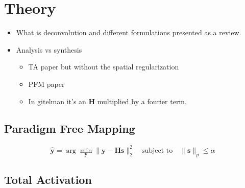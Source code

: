 \section{Theory}

\begin{itemize}
    \item What is deconvolution and different formulations presented as a review.
    \item Analysis vs synthesis
    \begin{itemize}
        \item TA paper but without the spatial regularization
        \item PFM paper
        \item In gitelman it's an $\mathbf{H}$ multiplied by a fourier term.
    \end{itemize}
\end{itemize}

\subsection{Paradigm Free Mapping}

\begin{equation}
    \hat{\mathbf{y}} = \arg \min_{\mathbf{y}} \| \mathbf{y} - \mathbf{Hs} \|_2^2 \quad \text{subject to} \quad \| \mathbf{s} \|_p \leq \alpha
\end{equation}

\subsection{Total Activation}